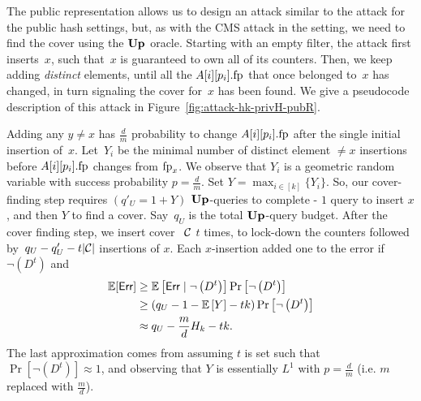 \begin{figure*}[ht!]
	\caption[Private Hash and Public Representation Attack.]{Cover Set Attack for the HK in private
		hash function and public representation setting. 
		The attack is parametrized with  the update query budget $q_U$. The attack uses the function Get-t$(.)$ from Figure \ref{fig:attack-hk-hfis}.
	}
	\label{fig:attack-hk-privH-pubR}
\end{figure*}
The public representation allows us to design an attack similar to the attack for the public hash settings, but, as with the CMS attack in the setting, we need to find the cover using the $\textup{\textbf{Up}}\hspace{0.5pt}$ oracle.
Starting with an empty filter, the attack first inserts~$x$, such that~$x$ is guaranteed to own all of its counters. Then, we keep adding \textit{distinct} elements, until all the $A[i][p_i].\textup{fp}$  that once belonged to~$x$ has changed, in turn signaling the cover for~$x$ has been found. We give a pseudocode description of this attack in Figure~\ref{fig:attack-hk-privH-pubR}.

Adding any $y \neq x$ has $\frac{d}{m}$ probability to change $A[i][p_i].\textup{fp}$ after the single initial insertion of~$x$. Let~$Y_i$ be the minimal number of distinct element $\neq x$ insertions before $A[i][p_i].\textup{fp}$ changes from $\textup{fp}_x$. We observe that $Y_i$ is a geometric random variable with success probability $p=\frac{d}{m}$. Set $Y=\max_{i \in [k]}\{Y_i\}$. So, our cover-finding step requires
$(q'_U  = 1+Y)$ $\textup{\textbf{Up}}\hspace{0.5pt}$-queries to complete - $1$ query to insert $x$, and then $Y$ to find a cover.
Say~$q_U$ is the total $\textup{\textbf{Up}}\hspace{0.5pt}$-query budget. After the cover finding step, we insert cover ~$\mathcal{C}$ $t$ times, to lock-down the counters followed by~$q_U - q_U' - t|\mathcal{C}|$ insertions of $x$. Each $x$-insertion added one to the error if $\lnot \left(D^t\right)$ and
\begin{align*}
	\mathbb{E}[\mathsf{Err}] &\geq \mathbb{E}\left[\mathsf{Err}  \mid \lnot \left(D^t\right)\right] \Pr\left[\lnot \left(D^t\right)\right] \\
	&\geq \left(q_U- 1- \mathbb{E}\left[Y \right] - tk\right)\Pr\left[\lnot \left(D^t\right)\right] \\
	&\approx q_U - \frac{m}{d} H_k-tk. 
\end{align*}
The last approximation comes from assuming $t$ is set such that $\Pr\left[\lnot \left(D^t\right)\right]\allowbreak \approx 1$, and observing that $Y$ is essentially $L^1$ with $p = \frac{d}{m}$ (i.e. $m$ replaced with $\frac{m}{d}$). 

